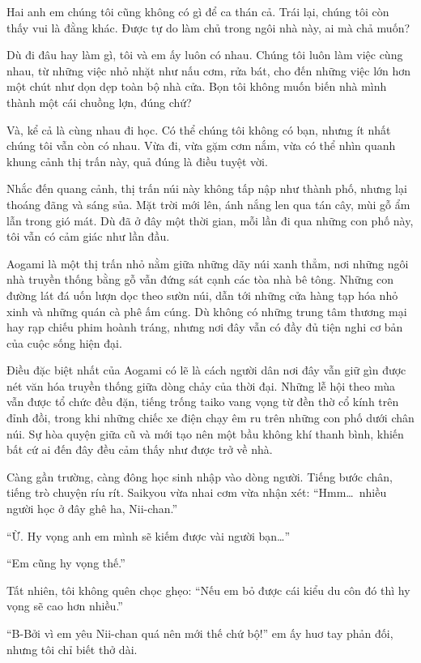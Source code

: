 \documentclass[../main.tex]{subfiles}
\begin{document}
Hai anh em chúng tôi cũng không có gì để ca thán cả. Trái lại, chúng tôi còn thấy vui là đằng khác. Được tự do làm chủ trong ngôi nhà này, ai mà chả muốn?

Dù đi đâu hay làm gì, tôi và em ấy luôn có nhau. Chúng tôi luôn làm việc cùng nhau, từ những việc nhỏ nhặt như nấu cơm, rửa bát, cho đến những việc lớn hơn một chút như dọn dẹp toàn bộ nhà cửa. Bọn tôi không muốn biến nhà mình thành một cái chuồng lợn, đúng chứ?

Và, kể cả là cùng nhau đi học. Có thể chúng tôi không có bạn, nhưng ít nhất chúng tôi vẫn còn có nhau. Vừa đi, vừa gặm cơm nắm, vừa có thể nhìn quanh khung cảnh thị trấn này, quả đúng là điều tuyệt vời.

Nhắc đến quang cảnh, thị trấn núi này không tấp nập như thành phố, nhưng lại thoáng đãng và sáng sủa. Mặt trời mới lên, ánh nắng len qua tán cây, mùi gỗ ẩm lẫn trong gió mát. Dù đã ở đây một thời gian, mỗi lần đi qua những con phố này, tôi vẫn có cảm giác như lần đầu.


Aogami là một thị trấn nhỏ nằm giữa những dãy núi xanh thẳm, nơi những ngôi nhà truyền thống bằng gỗ vẫn đứng sát cạnh các tòa nhà bê tông. Những con đường lát đá uốn lượn dọc theo sườn núi, dẫn tới những cửa hàng tạp hóa nhỏ xinh và những quán cà phê ấm cúng. Dù không có những trung tâm thương mại hay rạp chiếu phim hoành tráng, nhưng nơi đây vẫn có đầy đủ tiện nghi cơ bản của cuộc sống hiện đại.

Điều đặc biệt nhất của Aogami có lẽ là cách người dân nơi đây vẫn giữ gìn được nét văn hóa truyền thống giữa dòng chảy của thời đại. Những lễ hội theo mùa vẫn được tổ chức đều đặn, tiếng trống taiko vang vọng từ đền thờ cổ kính trên đỉnh đồi, trong khi những chiếc xe điện chạy êm ru trên những con phố dưới chân núi. Sự hòa quyện giữa cũ và mới tạo nên một bầu không khí thanh bình, khiến bất cứ ai đến đây đều cảm thấy như được trở về nhà.

Càng gần trường, càng đông học sinh nhập vào dòng người. Tiếng bước chân, tiếng trò chuyện ríu rít. Saikyou vừa nhai cơm vừa nhận xét: ``Hmm\dots\ nhiều người học ở đây ghê ha, Nii-chan.''

``Ừ. Hy vọng anh em mình sẽ kiếm được vài người bạn\dots''

``Em cũng hy vọng thế.''

Tất nhiên, tôi không quên chọc ghẹo: ``Nếu em bỏ được cái kiểu du côn đó thì hy vọng sẽ cao hơn nhiều.''

``B-Bởi vì em yêu Nii-chan quá nên mới thế chứ bộ!'' em ấy huơ tay phản đối, nhưng tôi chỉ biết thở dài.
\end{document}
